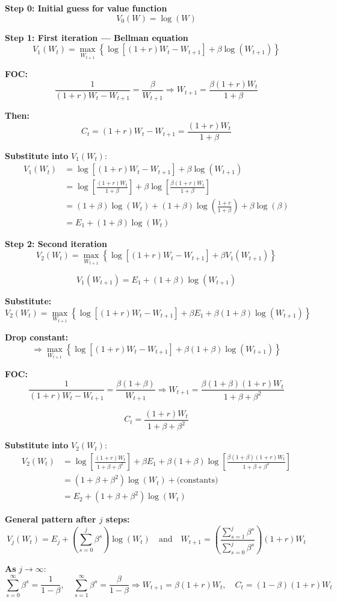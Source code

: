 \documentclass[12pt]{article}
\begin{document}
{\color{blue}

\textbf{Step 0: Initial guess for value function}
\[
V_0(W) = \log(W)
\]

\textbf{Step 1: First iteration — Bellman equation}
\[
V_1(W_t) = \max_{W_{t+1}} \left\{ \log\left[(1 + r)W_t - W_{t+1}\right] + \beta \log(W_{t+1}) \right\}
\]

\textbf{FOC:}
\[
\frac{1}{(1 + r)W_t - W_{t+1}} = \frac{\beta}{W_{t+1}}
\Rightarrow W_{t+1} = \frac{\beta(1 + r)W_t}{1 + \beta}
\]

\textbf{Then:}
\[
C_t = (1 + r)W_t - W_{t+1} = \frac{(1 + r)W_t}{1 + \beta}
\]

\textbf{Substitute into } $V_1(W_t)$:
\begin{align*}
V_1(W_t) &= \log\left[(1 + r)W_t - W_{t+1}\right] + \beta \log(W_{t+1}) \\
&= \log\left[\frac{(1 + r)W_t}{1 + \beta}\right] + \beta \log\left[\frac{\beta(1 + r)W_t}{1 + \beta}\right] \\
&= (1 + \beta) \log(W_t) + (1 + \beta) \log\left(\frac{1 + r}{1 + \beta}\right) + \beta \log(\beta) \\
&= E_1 + (1 + \beta) \log(W_t)
\end{align*}

\textbf{Step 2: Second iteration}
\[
V_2(W_t) = \max_{W_{t+1}} \left\{ \log\left[(1 + r)W_t - W_{t+1}\right] + \beta V_1(W_{t+1}) \right\}
\]

\[
V_1(W_{t+1}) = E_1 + (1 + \beta) \log(W_{t+1})
\]

\textbf{Substitute:}
\[
V_2(W_t) = \max_{W_{t+1}} \left\{ \log\left[(1 + r)W_t - W_{t+1}\right] + \beta E_1 + \beta(1 + \beta) \log(W_{t+1}) \right\}
\]

\textbf{Drop constant:}
\[
\Rightarrow \max_{W_{t+1}} \left\{ \log\left[(1 + r)W_t - W_{t+1}\right] + \beta(1 + \beta) \log(W_{t+1}) \right\}
\]

\textbf{FOC:}
\[
\frac{1}{(1 + r)W_t - W_{t+1}} = \frac{\beta(1 + \beta)}{W_{t+1}}
\Rightarrow W_{t+1} = \frac{\beta(1 + \beta)(1 + r)W_t}{1 + \beta + \beta^2}
\]

\[
C_t = \frac{(1 + r)W_t}{1 + \beta + \beta^2}
\]

\textbf{Substitute into } $V_2(W_t)$:
\begin{align*}
V_2(W_t) &= \log\left[\frac{(1 + r)W_t}{1 + \beta + \beta^2}\right]
+ \beta E_1 + \beta(1 + \beta) \log\left[\frac{\beta(1 + \beta)(1 + r)W_t}{1 + \beta + \beta^2}\right] \\
&= (1 + \beta + \beta^2) \log(W_t) + \text{(constants)} \\
&= E_2 + (1 + \beta + \beta^2) \log(W_t)
\end{align*}

\textbf{General pattern after $j$ steps:}
\[
V_j(W_t) = E_j + \left( \sum_{s=0}^j \beta^s \right) \log(W_t)
\quad \text{and} \quad
W_{t+1} = \left( \frac{\sum_{s=1}^j \beta^s}{\sum_{s=0}^j \beta^s} \right)(1 + r)W_t
\]

\textbf{As } $j \to \infty$:
\[
\sum_{s=0}^\infty \beta^s = \frac{1}{1 - \beta}, \quad
\sum_{s=1}^\infty \beta^s = \frac{\beta}{1 - \beta}
\Rightarrow
W_{t+1} = \beta(1 + r)W_t, \quad
C_t = (1 - \beta)(1 + r)W_t
\]

}
\end{document}
